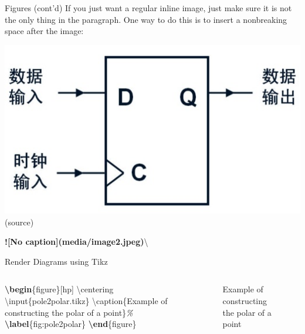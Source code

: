 \documentclass[
  10pt,
  ignorenonframetext,
  serif,onlymath]{beamer}
\newenvironment{Shaded}{}{}
\newcommand{\AlertTok}[1]{\textcolor[rgb]{1.00,0.00,0.00}{\textbf{#1}}}
\newcommand{\CommentTok}[1]{\textcolor[rgb]{0.38,0.63,0.69}{\textit{#1}}}
\newcommand{\ExtensionTok}[1]{#1}
\newcommand{\FunctionTok}[1]{\textcolor[rgb]{0.02,0.16,0.49}{#1}}
\newcommand{\KeywordTok}[1]{\textcolor[rgb]{0.00,0.44,0.13}{\textbf{#1}}}
\newcommand{\NormalTok}[1]{#1}
\begin{document}
\begin{frame}[fragile]{Figures (cont'd)}
\label{figures-contd}
If you just want a regular inline image, just make sure it is not the
only thing in the paragraph. One way to do this is to insert a
nonbreaking space after the image:

\includegraphics{media/image2.jpeg}\\

(source)

\begin{Shaded}
\begin{Highlighting}[]
\AlertTok{![No caption](media/image2.jpeg)}\NormalTok{\textbackslash{}}
\end{Highlighting}
\end{Shaded}
\end{frame}

\begin{frame}[fragile]{Render Diagrams using Tikz}
\label{render-diagrams-using-tikz}
\begin{columns}

\scriptsize

\begin{Shaded}
\begin{Highlighting}[]
\KeywordTok{\textbackslash{}begin}\NormalTok{\{}\ExtensionTok{figure}\NormalTok{\}[hp]}
\FunctionTok{\textbackslash{}centering}
\FunctionTok{\textbackslash{}input}\NormalTok{\{pole2polar.tikz\}}
\FunctionTok{\textbackslash{}caption}\NormalTok{\{Example of constructing}
\NormalTok{    the polar of a point\}}\CommentTok{\%}
\KeywordTok{\textbackslash{}label}\NormalTok{\{}\ExtensionTok{fig:pole2polar}\NormalTok{\}}
\KeywordTok{\textbackslash{}end}\NormalTok{\{}\ExtensionTok{figure}\NormalTok{\}}
\end{Highlighting}
\end{Shaded}


\begin{figure}[hp]
\centering

\caption{Example of constructing
    the polar of a point}%
\label{fig:pole2polar}
\end{figure}

\end{columns}
\end{frame}
\end{document}
